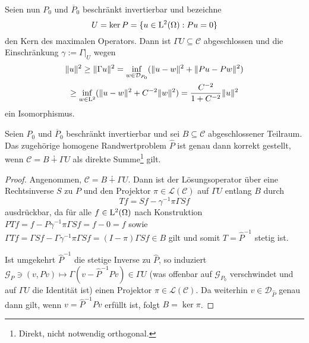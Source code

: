 Seien nun $P_0$ und $\overline P_0$ beschränkt invertierbar und bezeichne 
\begin{equation}
  U=\ker P = \{u\in\mathrm L^2(\Omega) : Pu =0\}
\end{equation}  
den Kern des maximalen Operators. Dann ist $\Gamma U\subseteq \mathcal C$ abgeschlossen und die Einschränkung $\gamma:=\Gamma|_U$ wegen
\begin{multline}
  \|u\|^2\ge \|\Gamma u\|^2 = \inf_{w\in \mathcal D_{P_0}} (\|u-w\|^2 + \|Pu - Pw\|^2) \\   \ge \inf_{w\in \mathrm L^2} (\|u-w\|^2 + C^{-2} \|w\|^2) = \frac{C^{-2}}{1+C^{-2}}\|u\|^2
\end{multline}
ein Isomorphismus. 
\begin{thm}
Seien $P_0$ und $\overline P_0$ beschränkt invertierbar und sei $B\subseteq\mathcal C$ abgeschlossener Teilraum. Das zugehörige homogene Randwertproblem $\widehat P$ ist genau dann korrekt gestellt, wenn $\mathcal C = B \dotplus \Gamma U $ als direkte Summe\footnote{Direkt, nicht notwendig orthogonal.} gilt.
\end{thm}
\begin{proof}
Angenommen, $\mathcal C = B \dotplus \Gamma U$. Dann ist der Lösungsoperator über eine Rechtsinverse $S$ zu $P$ und den Projektor $\pi\in\mathcal L(\mathcal C)$ auf  $\Gamma U$ entlang $B$ durch
\begin{equation}
     Tf = Sf-\gamma^{-1}\pi\Gamma Sf
\end{equation}
ausdrückbar, da für alle $f\in\mathrm L^2(\Omega)$ nach Konstruktion $PTf=f-P \gamma^{-1}\pi\Gamma S f=f-0=f$ sowie $\Gamma T f=\Gamma Sf - \Gamma\gamma^{-1}\pi \Gamma Sf=(I-\pi)\Gamma Sf\in B$ gilt und somit $T=\widehat P^{-1}$ stetig ist.  

Ist umgekehrt $\widehat P^{-1}$ die stetige Inverse zu $\widehat P$, so induziert
$\mathcal G_P\ni(v,Pv) \mapsto \Gamma(v-\widehat P^{-1}Pv)\in\Gamma U$ (was offenbar auf $\mathcal G_{P_0}$ verschwindet und auf $\Gamma U$ die Identität ist) einen Projektor $\pi\in\mathcal L(\mathcal C)$. Da weiterhin $v\in\mathcal D_{\widehat P}$ genau dann gilt, wenn $v=\widehat P^{-1}Pv$ erfüllt ist, folgt $B=\ker\pi$.
\end{proof}

